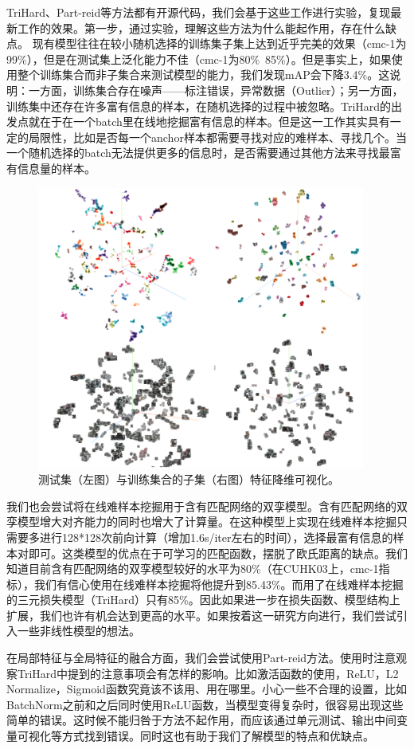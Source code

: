 TriHard、Part-reid等方法都有开源代码，我们会基于这些工作进行实验，复现最新工作的效果。第一步，通过实验，理解这些方法为什么能起作用，存在什么缺点。
现有模型往往在较小随机选择的训练集子集上达到近乎完美的效果（cmc-1为99\%），但是在测试集上泛化能力不佳（cmc-1为80\%~85\%）。但是事实上，如果使用整个训练集合而非子集合来测试模型的能力，我们发现mAP会下降3.4\%。这说明：一方面，训练集合存在噪声——标注错误，异常数据（Outlier）；另一方面，训练集中还存在许多富有信息的样本，在随机选择的过程中被忽略。TriHard的出发点就在于在一个batch里在线地挖掘富有信息的样本。但是这一工作其实具有一定的局限性，比如是否每一个anchor样本都需要寻找对应的难样本、寻找几个。当一个随机选择的batch无法提供更多的信息时，是否需要通过其他方法来寻找最富有信息量的样本。

\begin{figure}[!htbp]
    \centering
    \includegraphics[width=.5\linewidth,keepaspectratio]{data/kaitibaogao/vis2.png}
    \caption{测试集（左图）与训练集合的子集（右图）特征降维可视化。}
    \label{figure:vis2}
\end{figure}

我们也会尝试将在线难样本挖掘用于含有匹配网络的双孪模型。含有匹配网络的双孪模型增大对齐能力的同时也增大了计算量。在这种模型上实现在线难样本挖掘只需要多进行128*128次前向计算（增加1.6s/iter左右的时间），选择最富有信息的样本对即可。这类模型的优点在于可学习的匹配函数，摆脱了欧氏距离的缺点。我们知道目前含有匹配网络的双孪模型较好的水平为80\%（在CUHK03上，cmc-1指标），我们有信心使用在线难样本挖掘将他提升到85.43\%。而用了在线难样本挖掘的三元损失模型（TriHard）只有85\%。因此如果进一步在损失函数、模型结构上扩展，我们也许有机会达到更高的水平。如果按着这一研究方向进行，我们尝试引入一些非线性模型的想法。

在局部特征与全局特征的融合方面，我们会尝试使用Part-reid方法。使用时注意观察TriHard中提到的注意事项会有怎样的影响。比如激活函数的使用，ReLU，L2 Normalize，Sigmoid函数究竟该不该用、用在哪里。小心一些不合理的设置，比如BatchNorm之前和之后同时使用ReLU函数，当模型变得复杂时，很容易出现这些简单的错误。这时候不能归咎于方法不起作用，而应该通过单元测试、输出中间变量可视化等方式找到错误。同时这也有助于我们了解模型的特点和优缺点。

